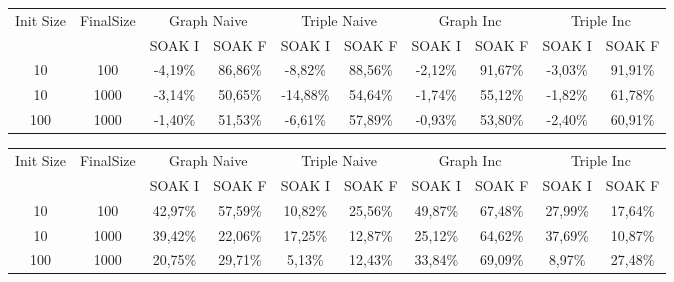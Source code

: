 \begin{sidewaystable}
	\begin{tabular}{c|c|cc|cc|cc|cc} %
	  	\hline
		Init Size&FinalSize &\multicolumn{2}{c}{Graph Naive}  &\multicolumn{2}{c}{Triple Naive}&\multicolumn{2}{c}{Graph Inc}  &\multicolumn{2}{c}{Triple Inc}\\\
		&& SOAK I & SOAK F& SOAK I & SOAK F& SOAK I & SOAK F& SOAK I & SOAK F\\
		\hline
		\hline
		10&100&-4,19\%&\cellcolor[HTML]{C0C0C0}86,86\%&-8,82\%&\cellcolor[HTML]{C0C0C0}88,56\%&-2,12\%&\cellcolor[HTML]{C0C0C0}91,67\%&-3,03\%&\cellcolor[HTML]{C0C0C0}91,91\%\\
		10&1000&-3,14\%&\cellcolor[HTML]{C0C0C0}50,65\%&-14,88\%&\cellcolor[HTML]{C0C0C0}54,64\%&-1,74\%&\cellcolor[HTML]{C0C0C0}55,12\%&-1,82\%&\cellcolor[HTML]{C0C0C0}61,78\%\\
		100&1000&-1,40\%&\cellcolor[HTML]{C0C0C0}51,53\%&-6,61\%&\cellcolor[HTML]{C0C0C0}57,89\%&-0,93\%&\cellcolor[HTML]{C0C0C0}53,80\%&-2,40\%&\cellcolor[HTML]{C0C0C0}60,91\%\\
		\hline
	\end{tabular}
	\caption[\textsc{Analyser} Investigation Stack - Level 1 - Step Response Test Maximum Latency Comparison]{\textsc{Analyser} Investigation Stack - Level 1 Step Response Test maximum latency comparison }
	\label{tab:step_latency_comparisons_max}
	

	\begin{tabular}{c|c|cc|cc|cc|cc} %
	  	\hline
		Init Size&FinalSize &\multicolumn{2}{c}{Graph Naive}  &\multicolumn{2}{c}{Triple Naive}&\multicolumn{2}{c}{Graph Inc}  &\multicolumn{2}{c}{Triple Inc}\\\
		&& SOAK I & SOAK F& SOAK I & SOAK F& SOAK I & SOAK F& SOAK I & SOAK F\\
		\hline
		\hline
		10&100&42,97\%&\cellcolor[HTML]{C0C0C0}57,59\%&10,82\%&25,56\%&49,87\%&\cellcolor[HTML]{C0C0C0}67,48\%&27,99\%&17,64\%\\
		10&1000&39,42\%&22,06\%&17,25\%&12,87\%&25,12\%&\cellcolor[HTML]{C0C0C0}64,62\%&37,69\%&10,87\%\\
		100&1000&20,75\%&29,71\%&5,13\%&12,43\%&33,84\%&\cellcolor[HTML]{C0C0C0}69,09\%&8,97\%&27,48\%\\
		\hline
	\end{tabular}
	\caption[\textsc{Analyser} Investigation Stack - Level 1 - Step Response Test Maximum Memory Comparison]{\textsc{Analyser} Investigation Stack - Level 1 Step Response Test maximum memory comparison }
	\label{tab:step_memory_comparisons_max}

	
\end{sidewaystable}